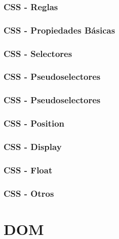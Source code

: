 \documentclass[a4paper,slidestop,xcolor=pst,blue]{beamer}
\begin{document}
\begin{frame}[c]
    \frametitle{CSS - Reglas}
\end{frame}

\begin{frame}[c]
    \frametitle{CSS - Propiedades Básicas}
\end{frame}

\begin{frame}[c]
    \frametitle{CSS - Selectores}
\end{frame}

\begin{frame}[c]
    \frametitle{CSS - Pseudoselectores}
\end{frame}

\begin{frame}[c]
    \frametitle{CSS - Pseudoselectores}
\end{frame}

\begin{frame}[c]
    \frametitle{CSS - Position}
\end{frame}

\begin{frame}[c]
    \frametitle{CSS - Display}
\end{frame}

\begin{frame}[c]
    \frametitle{CSS - Float}
\end{frame}

\begin{frame}[c]
    \frametitle{CSS - Otros}
\end{frame}

\section{DOM}
\end{document}
